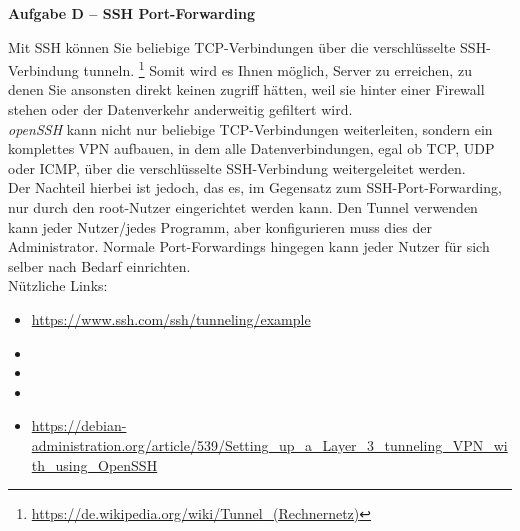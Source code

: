 \documentclass[paper=a4,fontsize=11pt]{scrartcl}%
\numberwithin{equation}{section}
\begin{document}
\begin{center}\Large{\textbf{Aufgabe D -- SSH Port-Forwarding}}\end{center}\vskip0.25in
Mit SSH können Sie beliebige TCP-Verbindungen über die verschlüsselte SSH-Verbindung \glqq tunneln\grqq. \footnote{\url{https://de.wikipedia.org/wiki/Tunnel_(Rechnernetz)}} Somit wird es Ihnen möglich, Server zu erreichen, zu denen Sie ansonsten direkt keinen zugriff hätten, weil sie hinter einer Firewall stehen oder der Datenverkehr anderweitig gefiltert wird.\\
\emph{openSSH} kann nicht nur beliebige TCP-Verbindungen weiterleiten, sondern ein komplettes VPN aufbauen, in dem alle Datenverbindungen, egal ob TCP, UDP oder ICMP, über die verschlüsselte SSH-Verbindung weitergeleitet werden.\\
Der Nachteil hierbei ist jedoch, das es, im Gegensatz zum SSH-Port-Forwarding, nur durch den root-Nutzer eingerichtet werden kann. Den Tunnel verwenden kann jeder Nutzer/jedes Programm, aber konfigurieren muss dies der Administrator. Normale Port-Forwardings hingegen kann jeder Nutzer für sich selber nach Bedarf einrichten.\\
Nützliche Links:
\begin{itemize}
	\item \url{https://www.ssh.com/ssh/tunneling/example}
	\item {}
	\item {}
	\item {}
	\item \url{https://debian-administration.org/article/539/Setting_up_a_Layer_3_tunneling_VPN_with_using_OpenSSH}
\end{itemize}
\end{document}
